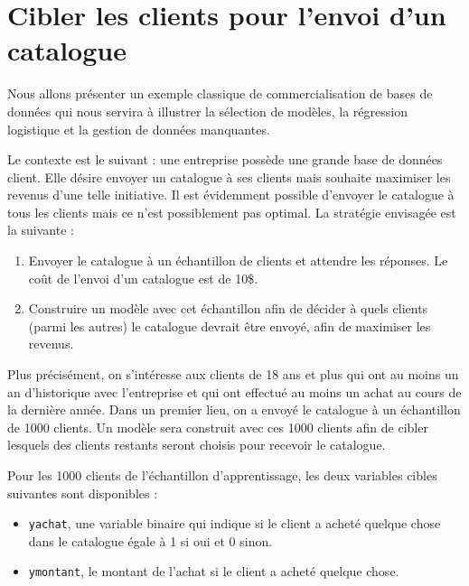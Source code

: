 \documentclass[
  11pt,
  letterpaper,
]{book}
\providecommand{\tightlist}{%
  \setlength{\itemsep}{0pt}\setlength{\parskip}{0pt}}
\theoremstyle{definition}
\theoremstyle{definition}
\theoremstyle{definition}
\theoremstyle{remark}
\begin{document}
\hypertarget{cibler-les-clients-pour-lenvoi-dun-catalogue}{%
\section{Cibler les clients pour l'envoi d'un catalogue}\label{cibler-les-clients-pour-lenvoi-dun-catalogue}}

Nous allons présenter un exemple classique de commercialisation de bases de données qui nous servira à illustrer la sélection de modèles, la régression logistique et la gestion de données manquantes.

Le contexte est le suivant : une entreprise possède une grande base de données client. Elle désire envoyer un catalogue à ses clients mais souhaite maximiser les revenus d'une telle initiative. Il est évidemment possible d'envoyer le catalogue à tous les clients mais ce n'est possiblement pas optimal. La stratégie envisagée est la suivante :

\begin{enumerate}
\def\labelenumi{\arabic{enumi}.}
\tightlist
\item
  Envoyer le catalogue à un échantillon de clients et attendre les réponses. Le coût de l'envoi d'un catalogue est de 10\$.
\item
  Construire un modèle avec cet échantillon afin de décider à quels clients (parmi les autres) le catalogue devrait être envoyé, afin de maximiser les revenus.
\end{enumerate}

Plus précisément, on s'intéresse aux clients de 18 ans et plus qui ont au moins un an d'historique avec l'entreprise et qui ont effectué au moins un achat au cours de la dernière année. Dans un premier lieu, on a envoyé le catalogue à un échantillon de 1000 clients. Un modèle sera construit avec ces 1000 clients afin de cibler lesquels des clients restants seront choisis pour recevoir le catalogue.

Pour les 1000 clients de l'échantillon d'apprentissage, les deux variables cibles suivantes sont disponibles :

\begin{itemize}
\tightlist
\item
  \texttt{yachat}, une variable binaire qui indique si le client a acheté quelque chose dans le catalogue égale à 1 si oui et 0 sinon.
\item
  \texttt{ymontant}, le montant de l'achat si le client a acheté quelque chose.
\end{itemize}
\end{document}
